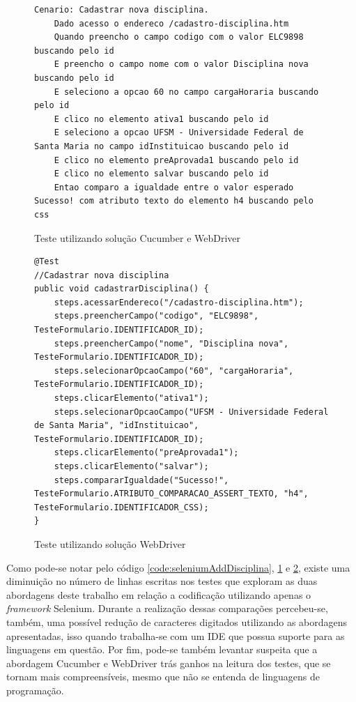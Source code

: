 \documentclass[tg]{mdtufsm}
\begin{document}
\begin{figure}[!htt]
	\begin{lstlisting}
Cenario: Cadastrar nova disciplina.
    Dado acesso o endereco /cadastro-disciplina.htm
    Quando preencho o campo codigo com o valor ELC9898 buscando pelo id
    E preencho o campo nome com o valor Disciplina nova buscando pelo id
    E seleciono a opcao 60 no campo cargaHoraria buscando pelo id
    E clico no elemento ativa1 buscando pelo id
    E seleciono a opcao UFSM - Universidade Federal de Santa Maria no campo idInstituicao buscando pelo id
    E clico no elemento preAprovada1 buscando pelo id
    E clico no elemento salvar buscando pelo id
    Entao comparo a igualdade entre o valor esperado Sucesso! com atributo texto do elemento h4 buscando pelo css
	\end{lstlisting}
	\caption{Teste utilizando solução Cucumber e WebDriver}
	\label{code:solucao2AddDisciplina}
\end{figure}

\begin{figure}[!htt]
	\begin{lstlisting}
@Test
//Cadastrar nova disciplina
public void cadastrarDisciplina() {
    steps.acessarEndereco("/cadastro-disciplina.htm");
    steps.preencherCampo("codigo", "ELC9898", TesteFormulario.IDENTIFICADOR_ID);
    steps.preencherCampo("nome", "Disciplina nova", TesteFormulario.IDENTIFICADOR_ID);
    steps.selecionarOpcaoCampo("60", "cargaHoraria", TesteFormulario.IDENTIFICADOR_ID);
    steps.clicarElemento("ativa1");
    steps.selecionarOpcaoCampo("UFSM - Universidade Federal de Santa Maria", "idInstituicao", TesteFormulario.IDENTIFICADOR_ID);
    steps.clicarElemento("preAprovada1");
    steps.clicarElemento("salvar");
    steps.compararIgualdade("Sucesso!", TesteFormulario.ATRIBUTO_COMPARACAO_ASSERT_TEXTO, "h4", TesteFormulario.IDENTIFICADOR_CSS);
}
	\end{lstlisting}
	\caption{Teste utilizando solução WebDriver}
	\label{code:solucao3AddDisciplina}
\end{figure}

Como pode-se notar pelo código \ref{code:seleniumAddDisciplina}, \ref{code:solucao2AddDisciplina} e \ref{code:solucao3AddDisciplina}, existe uma diminuição no número de linhas
escritas nos testes que exploram as duas abordagens deste trabalho em relação a codificação utilizando apenas o \emph{framework} Selenium. Durante a realização dessas
comparações percebeu-se, também, uma possível redução de caracteres digitados utilizando as abordagens apresentadas, isso quando trabalha-se com um IDE que possua suporte
para as linguagens em questão. Por fim, pode-se também levantar suspeita que a abordagem Cucumber e WebDriver trás ganhos na leitura dos testes, que se tornam mais
compreensíveis, mesmo que não se entenda de linguagens de programação.
\end{document}
